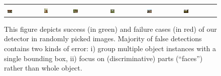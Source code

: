 \begin{figure}[t!]
\begin{tabular}{*{6}{C{0.13\textwidth}}}
  \includegraphics[height=0.12\textwidth,width=0.15\textwidth]{plant_pos_000737.pdf}&
  \includegraphics[height=0.12\textwidth,width=0.15\textwidth]{plant_pos_000933.pdf}&
  \includegraphics[height=0.12\textwidth,width=0.15\textwidth]{plant_neg_001070.pdf}&
  \includegraphics[height=0.12\textwidth,width=0.15\textwidth]{sheep_pos_000779.pdf}&
  \includegraphics[height=0.12\textwidth,width=0.15\textwidth]{sheep_pos_000627.pdf}&
  \includegraphics[height=0.12\textwidth,width=0.15\textwidth]{sheep_neg_000992.pdf}
  \end{tabular}
\caption{This figure depicts success (in green) and failure cases (in red) of our detector in randomly picked images. Majority of false detections contains two kinds of error: i) group multiple object instances with a single bounding box, ii) focus on (discriminative) parts (\eg ``faces'') rather than whole object. }
\label{fig:detexamples}
\end{figure}
